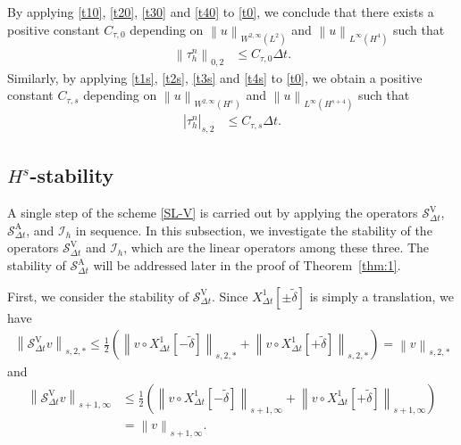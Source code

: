 \documentclass[10pt,a4paper,tbtags,leqno]{amsart}
\theoremstyle{definition}
\numberwithin{equation}{section}
\def\norm#1#2{\left\|#2\right\|_{#1}}
\def\snorm#1#2{\left|#2\right|_{#1}}
\begin{document}
By applying \eqref{t10}, \eqref{t20}, \eqref{t30} and \eqref{t40} to \eqref{t0}, we conclude that there exists a positive constant $ C_{\tau,0} $ depending on $ \norm{W^{2, \infty} (L^2)}{u} $ and $ \norm{L^{\infty} (H^4)}{u} $ such that 
\begin{align} 
  \norm{0, 2}{\tau_h^n} & \leq C_{\tau,0} \Delta t. \label{tau_0} 
\end{align} 
Similarly, by applying \eqref{t1s}, \eqref{t2s}, \eqref{t3s} and \eqref{t4s} to \eqref{t0}, we obtain a positive constant $ C_{\tau,s} $ depending on $ \norm{W^{2, \infty} (H^{s})}{u} $ and $ \norm{L^{\infty} (H^{s+4})}{u} $ such that 
\begin{align} 
  \snorm{s, 2}{\tau_h^n} & \leq C_{\tau,s} \Delta t. \label{tau_s} 
\end{align} 

\subsection{$ H^s $-stability} 

A single step of the scheme \eqref{SL-V} is carried out by applying the operators $\mathcal{S}_{\Delta t}^{\mathrm{V}}$, $\mathcal{S}_{\Delta t}^{\mathrm{A}}$, and $\mathcal{I}_{h}$ in sequence. In this subsection, we investigate the stability of the operators $\mathcal{S}_{\Delta t}^{\mathrm{V}}$ and $\mathcal{I}_{h}$, which are the linear operators among these three. The stability of $\mathcal{S}_{\Delta t}^{\mathrm{A}}$ will be addressed later in the proof of Theorem~\ref{thm:1}. 

First, we consider the stability of $ \mathcal{S}_{\Delta t}^{\mathrm{V}} $. Since $ X_{\Delta t}^1[\pm \tilde{\delta}] $ is simply a translation, we have 
\begin{align} 
  \norm{s, 2, \ast}{\mathcal{S}_{\Delta t}^{\mathrm{V}} v} \leq \frac{1}{2} \left(\norm{s, 2, \ast}{v \circ {X_{\Delta t}^1}[- \tilde{\delta}]} + \norm{s, 2, \ast}{v \circ {X_{\Delta t}^1}[+ \tilde{\delta}]}\right) = \norm{s, 2, \ast}{v} \label{b7} 
\end{align} 
and 
\begin{align} 
  \norm{s + 1, \infty}{\mathcal{S}_{\Delta t}^{\mathrm{V}} v} & \leq \frac{1}{2} \left(\norm{s + 1, \infty}{v \circ {X_{\Delta t}^1}[- \tilde{\delta}]} + \norm{s + 1, \infty}{v \circ {X_{\Delta t}^1}[+ \tilde{\delta}]}\right) \\ & = \norm{s + 1, \infty}{v}. \label{b7-2} 
\end{align} 
\end{document}
